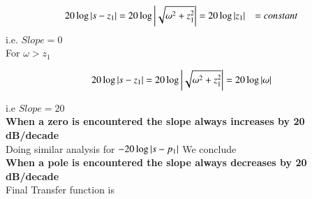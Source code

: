 \begin{enumerate}[label=\thesection.\arabic*.,ref=\thesection.\theenumi]
\begin{align}
	20\log \left\vert s-z_{1}\right\vert = 20\log \left\vert\sqrt{\omega^{2} + z_{1}^{2}}\right\vert 
	&= 20 \log \left\vert z_{1}\right\vert 
	&= constant 
\end{align}  
i.e. $Slope = 0$
\\
For $\omega > z_{1}$

\begin{align}
	20\log \left\vert s-z_{1}\right\vert = 20\log \left\vert\sqrt{\omega^{2} + z_{1}^{2}}\right\vert = 20 \log \left\vert\omega\right\vert 
\end{align}

i.e $Slope = 20 $
\\
\textbf{When a zero is encountered the slope always increases by 20 dB/decade}
\\
Doing similar analysis for $ - 20\log \left\vert s-p_{1}\right\vert $  We conclude
\\
\textbf{When a pole is encountered the slope always decreases by 20 dB/decade}
\\


Final Transfer function is


\end{enumerate}
